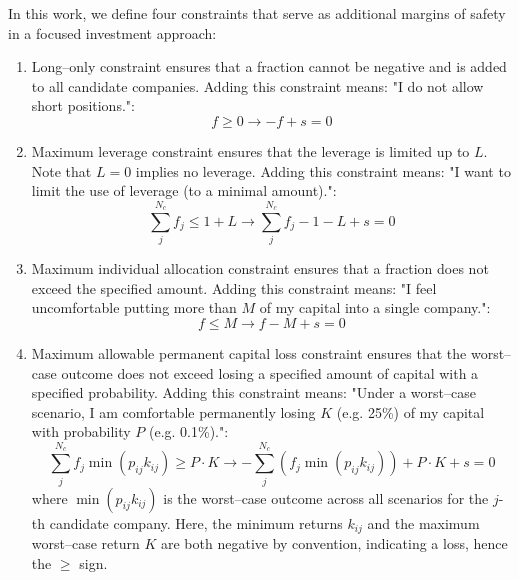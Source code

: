 \documentclass{article}
\begin{document}
\indent In this work, we define four constraints that serve as additional
margins of safety in a focused investment approach:
\begin{enumerate}
    \item Long--only constraint ensures that a fraction cannot be negative and
    is added to all candidate companies. Adding this constraint means: "I do not
    allow short positions.":
    \begin{equation}
        \label{eq:11}
            f \ge 0 \rightarrow -f + s = 0
        \end{equation}

    \item Maximum leverage constraint ensures that the leverage is limited up to
    $L$. Note that $L = 0$ implies no leverage. Adding this constraint means: "I
    want to limit the use of leverage (to a minimal amount).":
        \begin{equation}
        \label{eq:12}
            \sum_j^{N_c} f_j \le 1 + L \rightarrow \sum_j^{N_c} f_j - 1 - L + s = 0
        \end{equation}

    \item Maximum individual allocation constraint ensures that a fraction does
    not exceed the specified amount. Adding this constraint means: "I feel
    uncomfortable putting more than $M$ of my capital into a single company.":
        \begin{equation}
        \label{eq:13}
            f \le M \rightarrow f - M + s = 0
        \end{equation}

    \item Maximum allowable permanent capital loss constraint ensures that the
    worst--case outcome does not exceed losing a specified amount of capital
    with a specified probability. Adding this constraint means: "Under a
    worst--case scenario, I am comfortable permanently losing $K$ (e.g. 25\%) of
    my capital with probability $P$ (e.g. 0.1\%).":
        \begin{equation}
        \label{eq:14}
            \sum_j^{N_c} f_j \min(p_{ij} k_{ij}) \ge P \cdot K \rightarrow
            -\sum_j^{N_c} \left(f_j \min(p_{ij} k_{ij}) \right) + P \cdot K + s = 0
        \end{equation}
    \noindent where $\min(p_{ij} k_{ij})$ is the worst--case outcome across all
    scenarios for the $j$-th candidate company. Here, the minimum returns
    $k_{ij}$ and the maximum worst--case return $K$ are both negative by
    convention, indicating a loss, hence the $\ge$ sign.
\end{enumerate}
\end{document}
